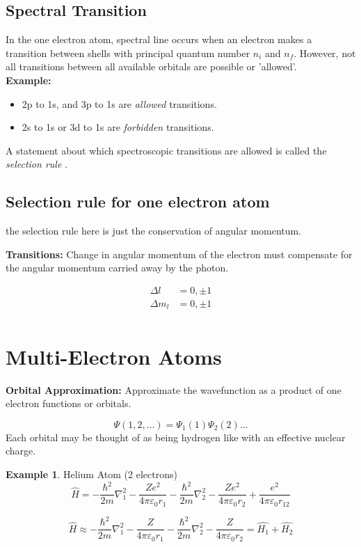 \documentclass[12pt]{article}
\theoremstyle{definition}
\newtheorem*{example}{Example}
\begin{document}
\subsection{Spectral Transition}

In the one electron atom, spectral line occurs when an electron makes a transition between shells with principal quantum number $n_i$ and $n_f$. However, not all transitions between all available orbitals are possible or 'allowed'.\\

\textbf{Example:}  
\begin{itemize}
	\item 2p to 1s, and 3p to 1s are \textit{allowed} transitions.
	\item 2s to 1s or 3d to 1s are \textit{forbidden} transitions.
\end{itemize}

A statement about which spectroscopic transitions are allowed is called the \textit{selection rule} .

\subsection{Selection rule for one electron atom}

the selection rule here is just the conservation of angular momentum.

\textbf{Transitions:} Change in angular momentum of the electron must compensate for the angular momentum carried away by the photon. 

\begin{align*}
	\Delta l &=  0, \pm 1 \\
	\Delta m_l &=  0, \pm 1 \\
\end{align*}

\section{Multi-Electron Atoms}

\textbf{Orbital Approximation:} Approximate the wavefunction as a product of one electron functions or orbitals.

\begin{equation*}
	\Psi(1, 2, \dots) = \Psi_1(1)\Psi_2(2) \dots
\end{equation*}
Each orbital may be thought of as being hydrogen like with an effective nuclear charge.

\begin{example} Helium Atom (2 electrons)
	\begin{equation*}
		\hat{H} = - \frac{\hbar^2}{2m} \nabla^2_1 - \frac{Ze^2}{4 \pi \varepsilon_0r_1} - \frac{\hbar^2}{2m}\nabla^2_2 - \frac{Ze^2}{4\pi\varepsilon_0 r_2} + \frac{e^2}{4\pi\varepsilon_0 r_{12}} 
	\end{equation*}

	\begin{equation*}
		\hat{H} \approx - \frac{\hbar^2}{2m} \nabla^2_1 - \frac{Z}{4\pi\varepsilon_0 r_1} - \frac{\hbar^2}{2m}\nabla^2_2 - \frac{Z}{4\pi\varepsilon_0 r_2} = \hat{H_1} + \hat{H_2}
	\end{equation*}

\end{example}
\end{document}
